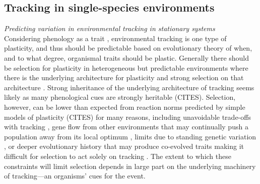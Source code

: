 \documentclass[11pt,letterpaper]{article}
\newcommand{\R}[1]{\label{#1}\linelabel{#1}}
\begin{document}
\subsection{Tracking in single-species environments}

\emph{Predicting variation in environmental tracking in stationary systems}\\ %
\R{plasS}Considering phenology as a trait \citep[as we and others do, e.g.,][]{charm2008,nicotra2010,forsman2015,inouye2019}, environmental tracking is one type of plasticity, and thus should be predictable based on evolutionary theory of when, and to what degree, organismal traits should be plastic. Generally there should be selection for plasticity in heterogeneous but predictable environments where there is the underlying architecture for plasticity and strong selection on that architecture \citep{Piersma:2003wj,reed2010}. Strong inheritance of the underlying architecture of tracking seems likely as many phenological cues are strongly heritable (CITES). \R{r1consS}Selection, however, can be lower than expected from reaction norms predicted by simple models of plasticity (CITES) for many reasons, including unavoidable trade-offs with tracking \citep{Singer:2010eb,Johansson2012}, gene flow from other environments that may continually push a population away from its local optimum \citep{lenormand2002}, limits due to standing genetic variation  \citep{Franks:2007wd,ghalambor2015}, or deeper evolutionary history that may produce co-evolved traits making it difficult for selection to act solely on tracking \citep{Ackerly:2009ly}.\R{r1consE} The extent to which these constraints will limit selection depends in large part on the underlying machinery of tracking---an organisms' cues for the event. 
\end{document}
